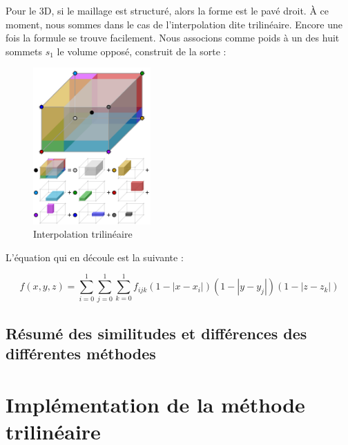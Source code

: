 Pour le 3D, si le maillage est structuré, alors la forme est le pavé droit. À ce moment, nous sommes dans le cas de l'interpolation dite trilinéaire. Encore une fois la formule se trouve facilement. Nous associons comme poids à un des huit sommets \( s_1 \) le volume opposé, construit de la sorte :

\begin{figure}[ht!]
    \centering
    \includegraphics[width=0.4\textwidth]{images/Trilinear_interpolation_visualisation.svg.png}
    \caption{Interpolation trilinéaire} %
\end{figure}

L'équation qui en découle est la suivante :

\begin{equation}
    f(x, y, z) = \sum_{i=0}^{1} \sum_{j=0}^{1} \sum_{k=0}^{1} f_{ijk} (1 - |x - x_i|)(1 - |y - y_j|)(1 - |z - z_k|)
\end{equation}



\subsection{Résumé des similitudes et différences des différentes méthodes}



\section{Implémentation de la méthode trilinéaire}
